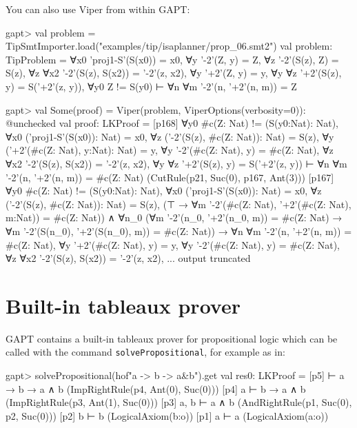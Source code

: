 \documentclass[a4paper,11pt]{book}
\begin{document}
You can also use Viper from within GAPT:
\begin{clilisting}
gapt> val problem = TipSmtImporter.load("examples/tip/isaplanner/prop_06.smt2")
val problem: TipProblem = ∀x0 'proj1-S'(S(x0)) = x0,
∀y '-2'(Z, y) = Z,
∀z '-2'(S(z), Z) = S(z),
∀z ∀x2 '-2'(S(z), S(x2)) = '-2'(z, x2),
∀y '+2'(Z, y) = y,
∀y ∀z '+2'(S(z), y) = S('+2'(z, y)),
∀y0 Z != S(y0)
⊢
∀n ∀m '-2'(n, '+2'(n, m)) = Z

gapt> val Some(proof) = Viper(problem, ViperOptions(verbosity=0)): @unchecked
val proof: LKProof = [p168] ∀y0 #c(Z: Nat) != (S(y0:Nat): Nat),
∀x0 ('proj1-S'(S(x0)): Nat) = x0,
∀z ('-2'(S(z), #c(Z: Nat)): Nat) = S(z),
∀y ('+2'(#c(Z: Nat), y:Nat): Nat) = y,
∀y '-2'(#c(Z: Nat), y) = #c(Z: Nat),
∀z ∀x2 '-2'(S(z), S(x2)) = '-2'(z, x2),
∀y ∀z '+2'(S(z), y) = S('+2'(z, y))
⊢
∀n ∀m '-2'(n, '+2'(n, m)) = #c(Z: Nat)    (CutRule(p21, Suc(0), p167, Ant(3)))
[p167] ∀y0 #c(Z: Nat) != (S(y0:Nat): Nat),
∀x0 ('proj1-S'(S(x0)): Nat) = x0,
∀z ('-2'(S(z), #c(Z: Nat)): Nat) = S(z),
(⊤ → ∀m '-2'(#c(Z: Nat), '+2'(#c(Z: Nat), m:Nat)) = #c(Z: Nat)) ∧
    ∀n_0
    (∀m '-2'(n_0, '+2'(n_0, m)) = #c(Z: Nat) →
      ∀m '-2'(S(n_0), '+2'(S(n_0), m)) = #c(Z: Nat)) →
  ∀n ∀m '-2'(n, '+2'(n, m)) = #c(Z: Nat),
∀y '+2'(#c(Z: Nat), y) = y,
∀y '-2'(#c(Z: Nat), y) = #c(Z: Nat),
∀z ∀x2 '-2'(S(z), S(x2)) = '-2'(z, x2),
... output truncated

\end{clilisting}

\section{Built-in tableaux prover}

GAPT contains a built-in tableaux prover for propositional logic
which can be called with the command \texttt{solvePropositional}, for example as in:
\begin{clilisting}
gapt> solvePropositional(hof"a -> b -> a&b").get
val res0: LKProof = [p5]  ⊢ a → b → a ∧ b    (ImpRightRule(p4, Ant(0), Suc(0)))
[p4] a ⊢ b → a ∧ b    (ImpRightRule(p3, Ant(1), Suc(0)))
[p3] a, b ⊢ a ∧ b    (AndRightRule(p1, Suc(0), p2, Suc(0)))
[p2] b ⊢ b    (LogicalAxiom(b:o))
[p1] a ⊢ a    (LogicalAxiom(a:o))

\end{clilisting}
\end{document}
